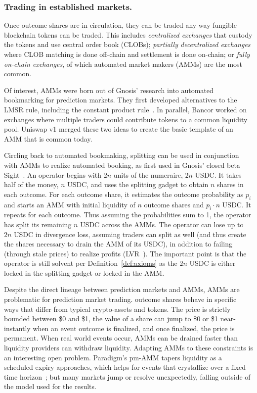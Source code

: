 \subsubsection{Trading in established markets.}

Once outcome shares are in circulation, they can be traded any way fungible blockchain tokens can be traded. This includes \textit{centralized exchanges} that custody the tokens and use central order book (CLOBs); \textit{partially decentralized exchanges} where CLOB matching is done off-chain and settlement is done on-chain; or \textit{fully on-chain exchanges}, of which automated market makers (AMMs) are the most common. 

Of interest, AMMs were born out of Gnosis' research into automated bookmarking for prediction markets. They first developed alternatives to the LMSR rule, including the constant product rule~\cite{LK17}. In parallel, Bancor worked on exchanges where multiple traders could contribute tokens to a common liquidity pool. Uniswap v1 merged these two ideas to create the basic template of an AMM that is common today.

Circling back to automated bookmaking, splitting can be used in conjunction with AMMs to realize automated booking, as first used in Gnosis' closed beta Sight~\cite{Bar19}. An operator begins with $2n$ units of the numeraire, \eg $2n$ USDC. It takes half of the money, $n$ USDC, and uses the splitting gadget to obtain $n$ shares in each outcome. For each outcome share, it estimates the outcome probability as $p_i$ and starts an AMM with initial liquidity of $n$ outcome shares and $p_i\cdot n$ USDC. It repeats for each outcome. Thus assuming the probabilities sum to 1, the operator has split its remaining $n$ USDC across the AMMs. The operator can lose up to $2n$ USDC in divergence loss, assuming traders can split as well (and thus create the shares necessary to drain the AMM of its USDC), in addition to failing (through stale prices) to realize profits (\ie LVR~\cite{MMRZ22}). The important point is that the operator is still solvent per Definition~\ref{def:axioms} as the $2n$ USDC is either locked in the splitting gadget or locked in the AMM.

Despite the direct lineage between prediction markets and AMMs, AMMs are problematic for prediction market trading. \depm outcome shares behave in specific ways that differ from typical crypto-assets and tokens. The price is strictly bounded between \$0 and \$1, the value of a share can jump to \$0 or \$1 near-instantly when an event outcome is finalized, and once finalized, the price is permanent. When real world events occur, AMMs can be drained faster than liquidity providers can withdraw liquidity. Adapting AMMs to these constraints is an interesting open problem. Paradigm’s pm-AMM tapers liquidity as a scheduled expiry approaches, which helps for events that crystallize over a fixed time horizon~\cite{MR24}; but many markets jump or resolve unexpectedly, falling outside of the model used for the results.

